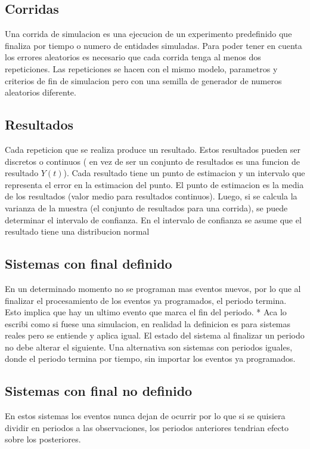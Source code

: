 \documentclass[a4paper]{article}
\begin{document}
\subsection*{Corridas}
Una corrida de simulacion es una ejecucion de un experimento predefinido que finaliza por tiempo o numero
de entidades simuladas. 
Para poder tener en cuenta los errores aleatorios es necesario que cada corrida tenga al menos dos 
repeticiones. Las repeticiones se hacen con el mismo modelo, parametros y criterios de fin de simulacion pero
con una semilla de generador de numeros aleatorios diferente.

\subsection*{Resultados}
Cada repeticion que se realiza produce un resultado. Estos resultados pueden ser discretos o continuos (
en vez de ser un conjunto de resultados es una funcion de resultado $Y(t)$).
Cada resultado tiene un punto de estimacion y un intervalo que representa el error en la estimacion del punto.
El punto de estimacion es la media de los resultados (valor medio para resultados continuos).
Luego, si se calcula la varianza de la muestra (el conjunto de resultados para una corrida), se puede determinar 
el intervalo de confianza. En el intervalo de confianza se asume que el resultado tiene una distribucion normal

\subsection*{Sistemas con final definido}
En un determinado momento no se programan mas eventos nuevos, por lo que al finalizar el procesamiento 
de los eventos ya programados, el periodo termina. Esto implica que hay un ultimo evento que marca el fin del
periodo. * Aca lo escribi como si fuese una simulacion, en realidad la definicion es para sistemas reales pero se 
entiende y aplica igual.
El estado del sistema al finalizar un periodo no debe alterar el siguiente.
Una alternativa son sistemas con periodos iguales, donde el periodo termina por tiempo, sin importar los eventos 
ya programados.

\subsection*{Sistemas con final no definido}
En estos sistemas los eventos nunca dejan de ocurrir por lo que si se quisiera dividir en periodos a las observaciones,
los periodos anteriores tendrian efecto sobre los posteriores.
\end{document}
